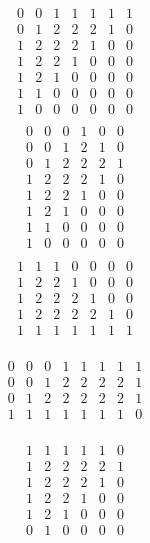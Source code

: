 \documentclass[12pt]{article}
\begin{document}
\begin{equation}
	\begin{matrix}
		0&0&1&1&1&1&1\\
		0&1&2&2&2&1&0\\
		1&2&2&2&1&0&0\\
		1&2&2&1&0&0&0\\
		1&2&1&0&0&0&0\\
		1&1&0&0&0&0&0\\
		1&0&0&0&0&0&0\\
	\end{matrix}
\end{equation}
\begin{equation}
	\begin{matrix}
		0&0&0&1&0&0\\
		0&0&1&2&1&0\\
		0&1&2&2&2&1\\
		1&2&2&2&1&0\\
		1&2&2&1&0&0\\
		1&2&1&0&0&0\\
		1&1&0&0&0&0\\
		1&0&0&0&0&0\\
	\end{matrix}
\end{equation}
\begin{equation}
	\begin{matrix}
		1&1&1&0&0&0&0\\
		1&2&2&1&0&0&0\\
		1&2&2&2&1&0&0\\
		1&2&2&2&2&1&0\\
		1&1&1&1&1&1&1\\
	\end{matrix}
\end{equation}

\begin{equation}
	\begin{matrix}
		0&0&0&1&1&1&1&1\\
		0&0&1&2&2&2&2&1\\
		0&1&2&2&2&2&2&1\\
		1&1&1&1&1&1&1&0\\
	\end{matrix}
\end{equation}

\begin{equation}
	\begin{matrix}
		1&1&1&1&1&0\\
		1&2&2&2&2&1\\
		1&2&2&2&1&0\\
		1&2&2&1&0&0\\
		1&2&1&0&0&0\\
		0&1&0&0&0&0\\
	\end{matrix}
\end{equation}
\end{document}
